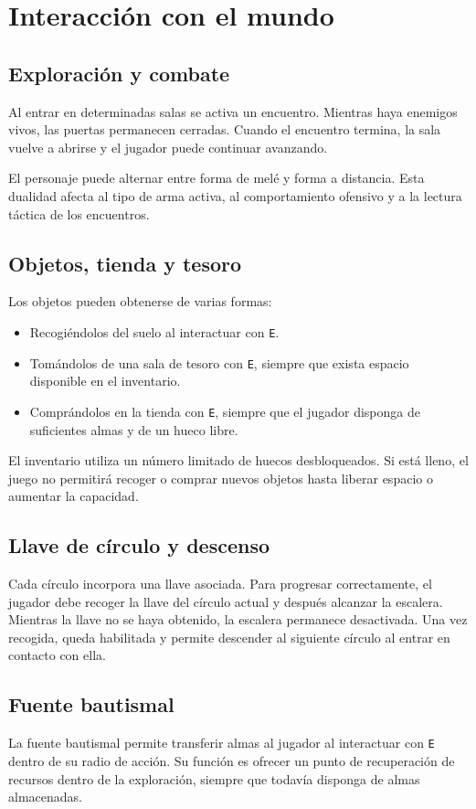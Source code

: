 \section{Interacción con el mundo}
\subsection{Exploración y combate}
Al entrar en determinadas salas se activa un encuentro. Mientras haya enemigos vivos, las
puertas permanecen cerradas. Cuando el encuentro termina, la sala vuelve a abrirse y el
jugador puede continuar avanzando.

El personaje puede alternar entre forma de melé y forma a distancia. Esta dualidad afecta al
tipo de arma activa, al comportamiento ofensivo y a la lectura táctica de los encuentros.

\subsection{Objetos, tienda y tesoro}
Los objetos pueden obtenerse de varias formas:

\begin{itemize}
    \item Recogiéndolos del suelo al interactuar con \texttt{E}.
    \item Tomándolos de una sala de tesoro con \texttt{E}, siempre que exista espacio disponible en el inventario.
    \item Comprándolos en la tienda con \texttt{E}, siempre que el jugador disponga de suficientes almas y de un hueco libre.
\end{itemize}

El inventario utiliza un número limitado de huecos desbloqueados. Si está lleno, el juego no
permitirá recoger o comprar nuevos objetos hasta liberar espacio o aumentar la capacidad.

\subsection{Llave de círculo y descenso}
Cada círculo incorpora una llave asociada. Para progresar correctamente, el jugador debe
recoger la llave del círculo actual y después alcanzar la escalera. Mientras la llave no se
haya obtenido, la escalera permanece desactivada. Una vez recogida, queda habilitada y
permite descender al siguiente círculo al entrar en contacto con ella.

\subsection{Fuente bautismal}
La fuente bautismal permite transferir almas al jugador al interactuar con \texttt{E} dentro
de su radio de acción. Su función es ofrecer un punto de recuperación de recursos dentro de
la exploración, siempre que todavía disponga de almas almacenadas.

